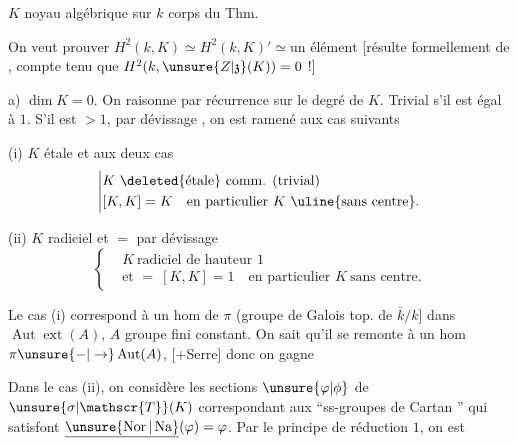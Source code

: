 
$K$ noyau algébrique sur $k$ corps du Thm.

On veut prouver $H^2(k,K)\simeq H^2(k,K)'\simeq\text{un élément}$ [résulte formellement de , compte tenu que $H^2(k,\unsure{Z|\mathfrak{z}}(K))=0$ !] 

a) $\dim K=0$. On raisonne par récurrence sur le degré de $K$. Trivial s'il est égal à $1$. S'il est $>1$, par dévissage , on est ramené aux cas suivants

(i) $K$ étale et  aux deux cas
\[
\left|\begin{aligned}
&K\ \deleted{\text{étale}}\ \text{comm. (trivial)}\\
&[K,K]=K\quad\text{en particulier }K\ \uline{\text{sans centre}}.
\end{aligned}\right.
\]

(ii) $K$ radiciel et $=$ par dévissage
\[
\left\{\begin{aligned}
&K\ \text{radiciel de hauteur }1\\
&\text{et }=\ [K,K]=1\quad\text{en particulier }K\ \text{sans centre}.
\end{aligned}\right.
\]

Le cas (i) correspond à un hom de $\pi$ (groupe de Galois top. de $\bar k/k$] dans $\operatorname{Aut}\operatorname{ext}(A)$, $A$ groupe fini constant. On sait qu'il se remonte à un hom $\pi\unsure{-|\to}\operatorname{Aut}(A)$, [+Serre] donc on gagne 

Dans le cas (ii), on considère les sections $\unsure{\varphi|\phi}$ de $\unsure{\sigma|\mathscr{T}}(K)$ correspondant aux ``ss-groupes de Cartan ''  qui satisfont $\underline{\unsure{\operatorname{Nor}|\operatorname{Na}}}(\varphi)=\varphi$. Par le principe de réduction $1$, on est



